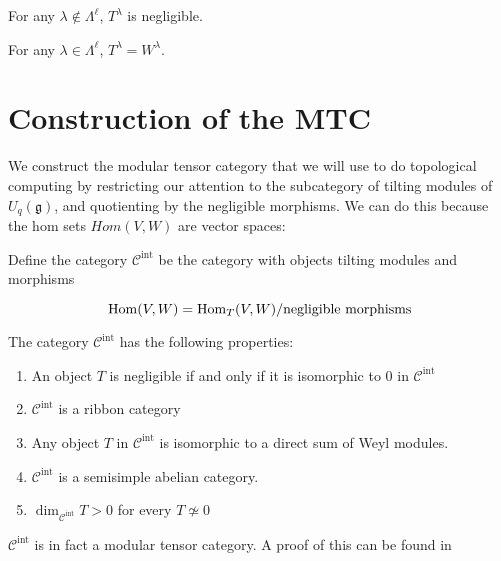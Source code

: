 \begin{theorem}
For any $\lambda \notin \Lambda^\ell$, $T^\lambda$ is negligible. 
\end{theorem}

\begin{theorem}
For any $\lambda \in \Lambda^\ell$, $T^\lambda = W^\lambda$.
\end{theorem}



\section{Construction of the MTC}
\label{MTC-construction}

We construct the modular tensor category that we will use to do topological
computing by restricting our attention to the subcategory of tilting modules of
$U_q(\mathfrak{g})$, and quotienting by the negligible morphisms. We can do
this because the hom sets $Hom(V,W)$ are vector spaces:

\begin{defn}
    Define the category $\mathcal{C}^\text{int}$ be the category with objects tilting modules and morphisms 

    \begin{equation*}
        \operatorname{Hom}(V,W) = \operatorname{Hom}_T(V,W) / \text{negligible morphisms}
    \end{equation*}

\end{defn}

The category $\mathcal{C}^\text{int}$ has the following properties:
\begin{enumerate}
    \item An object $T$ is negligible if and only if it is isomorphic to 0 in $\mathcal{C}^\text{int}$
    \item  $\mathcal{C}^\text{int}$ is a ribbon category
    \item Any object $T$ in $\mathcal{C}^\text{int}$ is isomorphic to a direct sum of Weyl modules.
    \item $\mathcal{C}^\text{int}$ is a semisimple abelian category. 
    \item $\dim_{\mathcal{C}^\text{int}} T > 0$ for every $T \not\simeq 0$
\end{enumerate}

$\mathcal{C}^\text{int}$ is in fact a modular tensor category. A proof of this
can be found in \cite{Kirillov} 
 
